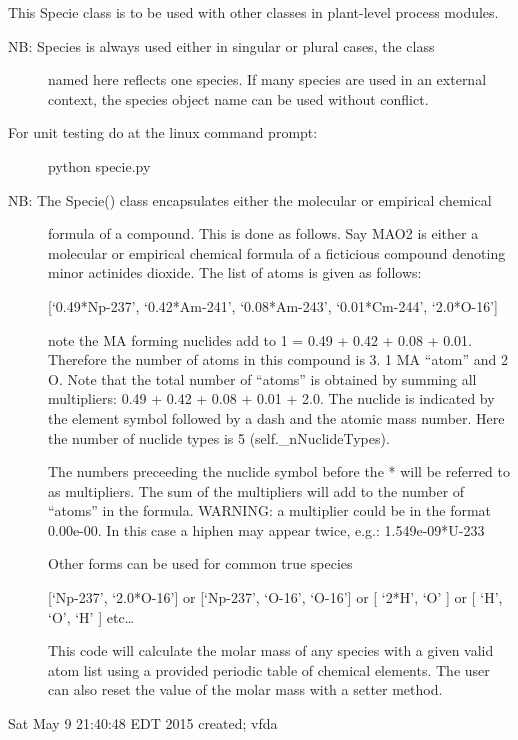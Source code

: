 \documentclass[letterpaper,10pt,openany,oneside,english]{sphinxmanual}
\begin{document}
This Specie class is to be used with other classes in plant-level process modules.
\begin{description}
\item[{NB: Species is always used either in singular or plural cases, the class}] \leavevmode
named here reflects one species. If many species are used in an external
context, the species object name can be used without conflict.

\item[{For unit testing do at the linux command prompt:}] \leavevmode
python specie.py

\item[{NB: The Specie() class encapsulates either the molecular or empirical chemical}] \leavevmode
formula of a compound.
This is done as follows. Say MAO2 is either a molecular or empirical chemical
formula of a ficticious compound denoting minor actinides dioxide. The list
of atoms is given as follows:

{[}‘0.49*Np-237’, ‘0.42*Am-241’, ‘0.08*Am-243’, ‘0.01*Cm-244’, ‘2.0*O-16’{]}

note the MA forming nuclides add to 1 = 0.49 + 0.42 + 0.08 + 0.01. Therefore
the number of atoms in this compound is 3. 1 MA “atom” and 2 O.
Note that the total number of “atoms” is obtained by summing all multipliers:
0.49 + 0.42 + 0.08 + 0.01 + 2.0.
The nuclide is indicated by the element symbol followed by a dash and the
atomic mass number. Here the number of nuclide types is 5 (self.\_nNuclideTypes).

The numbers preceeding the nuclide symbol before the * will be referred to as
multipliers. The sum of the multipliers will add to the number of “atoms” in
the formula. WARNING: a multiplier could be in the format 0.00e-00. In this
case a hiphen may appear twice, e.g.: 1.549e-09*U-233

Other forms can be used for common true species

{[}‘Np-237’, ‘2.0*O-16’{]} or {[}‘Np-237’, ‘O-16’, ‘O-16’{]} or {[} ‘2*H’, ‘O’ {]} or
{[} ‘H’, ‘O’, ‘H’ {]}  etc…

This code will calculate the molar mass of any species with a given valid
atom list using a provided periodic table of chemical elements. The user
can also reset the value of the molar mass with a setter method.

\end{description}

Sat May  9 21:40:48 EDT 2015 created; vfda
\end{document}
